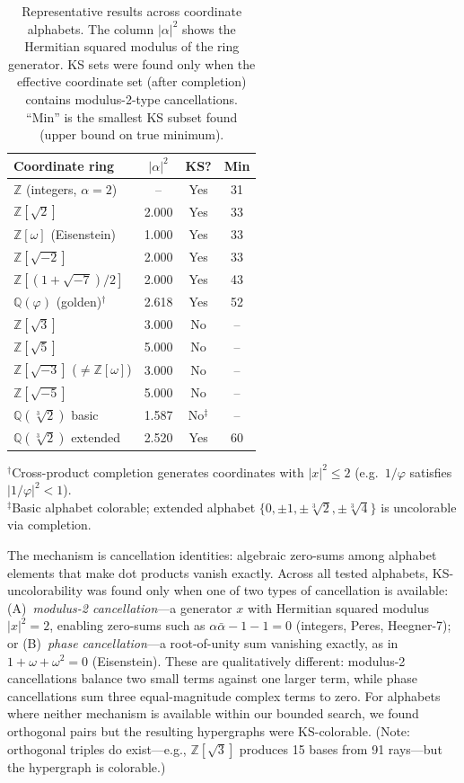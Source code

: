 \documentclass[twocolumn,prl,superscriptaddress,nofootinbib]{revtex4-2}
\newcommand{\Z}{\mathbb{Z}}
\newcommand{\Q}{\mathbb{Q}}
\begin{document}
\begin{table}[t]
\centering
\caption{Representative results across coordinate alphabets. The column $|\alpha|^2$ shows the Hermitian squared modulus of the ring generator. KS sets were found only when the effective coordinate set (after completion) contains modulus-2-type cancellations. ``Min'' is the smallest KS subset found (upper bound on true minimum).}
\label{tab:boundary}
\begin{tabular}{lccc}
\toprule
Coordinate ring & $|\alpha|^2$ & KS? & Min \\
\midrule
$\Z$ (integers, $\alpha=2$) & -- & Yes & 31 \\
$\Z[\sqrt{2}]$ & 2.000 & Yes & 33 \\
$\Z[\omega]$ (Eisenstein) & 1.000 & Yes & 33 \\
$\Z[\sqrt{-2}]$ & 2.000 & Yes & 33 \\
$\Z[(1{+}\sqrt{-7})/2]$ & 2.000 & Yes & 43 \\
$\Q(\varphi)$ (golden)$^\dagger$ & 2.618 & Yes & 52 \\
\midrule
$\Z[\sqrt{3}]$ & 3.000 & No & -- \\
$\Z[\sqrt{5}]$ & 5.000 & No & -- \\
$\Z[\sqrt{-3}]$ ($\neq \Z[\omega]$) & 3.000 & No & -- \\
$\Z[\sqrt{-5}]$ & 5.000 & No & -- \\
$\Q(\sqrt[3]{2})$ basic & 1.587 & No$^\ddagger$ & -- \\
$\Q(\sqrt[3]{2})$ extended & 2.520 & Yes & 60 \\
\bottomrule
\end{tabular}
\begin{flushleft}
\footnotesize $^\dagger$Cross-product completion generates coordinates with $|x|^2 \leq 2$ (e.g.\ $1/\varphi$ satisfies $|1/\varphi|^2 < 1$).\\
$^\ddagger$Basic alphabet colorable; extended alphabet $\{0,\pm 1,\pm\sqrt[3]{2},\pm\sqrt[3]{4}\}$ is uncolorable via completion.
\end{flushleft}
\end{table}

The mechanism is cancellation identities: algebraic zero-sums among alphabet elements that make dot products vanish exactly.  Across all tested alphabets, KS-uncolorability was found only when one of two types of cancellation is available: (A)~\emph{modulus-2 cancellation}---a generator $x$ with Hermitian squared modulus $|x|^2 = 2$, enabling zero-sums such as $\alpha\bar\alpha - 1 - 1 = 0$ (integers, Peres, Heegner-7); or (B)~\emph{phase cancellation}---a root-of-unity sum vanishing exactly, as in $1+\omega+\omega^2 = 0$ (Eisenstein).  These are qualitatively different: modulus-2 cancellations balance two small terms against one larger term, while phase cancellations sum three equal-magnitude complex terms to zero.  For alphabets where neither mechanism is available within our bounded search, we found orthogonal pairs but the resulting hypergraphs were KS-colorable. (Note: orthogonal triples do exist---e.g., $\Z[\sqrt{3}]$ produces 15 bases from 91 rays---but the hypergraph is colorable.)
\end{document}
